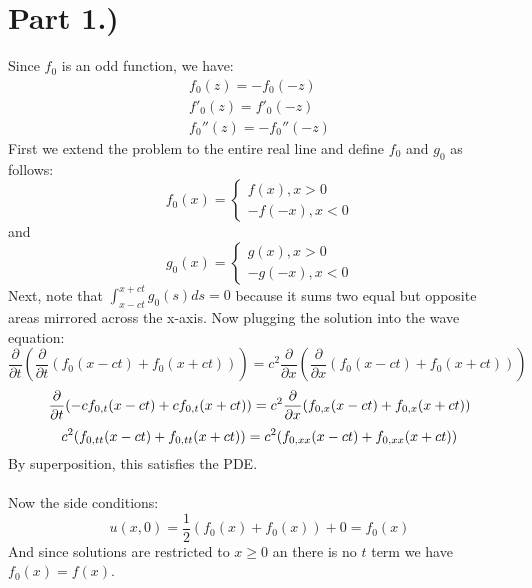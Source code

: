 \documentclass{article}
\begin{document}
\section*{Part 1.)} 
Since $f_0$ is an odd function, we have:
\begin{equation}
\begin{aligned}
f_0(z) = -f_0(-z)\\
f'_0(z) = f'_0(-z)\\
f_0''(z) = -f_0''(-z)
\end{aligned}
\end{equation}
First we extend the problem to the entire real line and define $f_0$ and $g_0$ as follows:
\[f_0(x) =
  \begin{cases}
               f(x) , x > 0\\
               -f(-x), x < 0
            \end{cases}
\]
and
\[g_0(x) =
  \begin{cases}
               g(x) , x > 0\\
               -g(-x), x < 0
            \end{cases}
\]
Next, note that $\int_{x-ct}^{x+ct} g_0(s)ds = 0$ because it sums two equal but opposite areas mirrored across the x-axis. Now plugging the solution into the wave equation:
\begin{equation}
\frac{\partial}{\partial t} (\frac{\partial}{\partial t}(f_0(x-ct) + f_0(x + ct))) = c^2 \frac{\partial}{\partial x} (\frac{\partial}{\partial x}(f_0(x-ct) + f_0(x + ct)))
\end{equation}
\begin{equation}
\frac{\partial}{\partial t}(-cf_{0,t}(x-ct) + cf_{0,t}(x + ct)) = c^2 \frac{\partial}{\partial x}(f_{0,x}(x-ct) + f_{0,x}(x + ct))\\
\end{equation}
\begin{equation}
c^2(f_{0,tt}(x-ct) + f_{0,tt}(x + ct)) = c^2(f_{0,xx}(x-ct) + f_{0,xx}(x + ct))\\
\end{equation}
By superposition, this satisfies the PDE.\\
\\
Now the side conditions:
\begin{equation}
u(x,0) = \frac{1}{2}(f_0(x) + f_0(x)) + 0 = f_0(x)
\end{equation}
And since solutions are restricted to $x\geq 0$ an there is no $t$ term we have $f_0(x) = f(x)$.\\
\\
\end{document}
